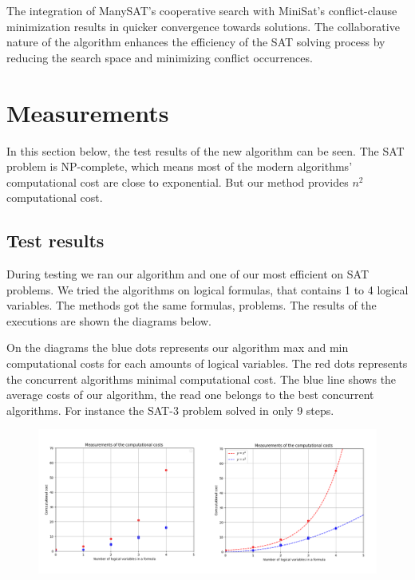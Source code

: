 \documentclass{article}
\begin{document}
The integration of ManySAT’s cooperative search with MiniSat’s conflict-clause minimization results in quicker convergence towards solutions. The collaborative nature of the algorithm enhances the efficiency of the SAT solving process by reducing the search space and minimizing conflict occurrences.

\section{Measurements}
\label{sec:measurements}

In this section below, the test results of the new algorithm can be seen. The SAT problem is NP-complete, which means most of the modern algorithms' computational cost are close to exponential. But our method provides $n^{2}$ computational cost.

\subsection{Test results}
During testing we ran our algorithm and one of our most efficient on SAT problems. We tried the algorithms on logical formulas, that contains 1 to 4 logical variables. The methods got the same formulas, problems. The results of the executions are shown the diagrams below.

On the diagrams the blue dots represents our algorithm max and min computational costs for each amounts of logical variables. The red dots represents the concurrent algorithms minimal computational cost. The blue line shows the average costs of our algorithm, the read one belongs to the best concurrent algorithms. For instance the SAT-3 problem solved in only 9 steps.

\begin{figure}[h]
    \centering
    \includegraphics[width=1\linewidth]{img/measurements.png}
\end{figure}
\end{document}
